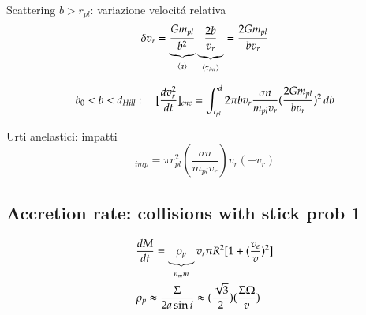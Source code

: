 {Scattering $b>r_{pl}$: variazione velocit\'a relativa}
\begin{equation*}
\delta v_r=\underbrace{\frac{Gm_{pl}}{b^2}}_{\exv{a}}\underbrace{\frac{2b}{v_r}}_{\exv{\tau_{int}}}=\frac{2Gm_{pl}}{bv_r}
\end{equation*}

\begin{equation*}
b_0<b<d_{Hill}:\quad [\TDy{t}{v_r^2}]_{enc}=\int_{r_{pl}}^d2\pi bv_r\frac{\sigma n}{m_{pl}v_r}(\frac{2Gm_{pl}}{bv_r})^2\,db
\end{equation*}

{Urti anelastici: impatti}
\begin{equation*}
[\TDy{t}{v_r^2}]_{imp}=\pi r_{pl}^2(\frac{\sigma n}{m_{pl}v_r})v_r(-v_r)
\end{equation*}

\subsection{Accretion rate: collisions with stick prob 1}
\begin{align}
&\TDy{t}{M}=\underbrace{\rho_p}_{n_mm}v_r\pi R^2[1+(\frac{v_e}{v})^2]\\
&\rho_p\approx\frac{\Sigma}{2a\sin{i}}\approx(\frac{\sqrt{3}}{2})(\frac{\Sigma\Omega}{v})
\end{align}

